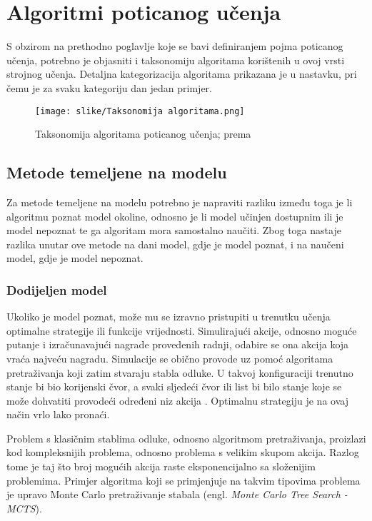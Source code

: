 \documentclass[]{foi} %
\begin{document}
\section{Algoritmi poticanog učenja}
S obzirom na prethodno poglavlje koje se bavi definiranjem pojma poticanog učenja, potrebno je objasniti i
taksonomiju algoritama korištenih u ovoj vrsti strojnog učenja. Detaljna kategorizacija algoritama prikazana \cite[poglavlje 3]{DeepRL} je u nastavku, pri čemu je za svaku kategoriju dan jedan primjer.

\begin{figure}[H]
    \centering
    \texttt{[image: slike/Taksonomija algoritama.png]}
    \caption{Taksonomija algoritama poticanog učenja; prema \cite[poglavlje 3]{DeepRL}}
\end{figure}

\subsection{Metode temeljene na modelu}
Za metode temeljene na modelu potrebno je napraviti razliku između toga je li algoritmu poznat model okoline, odnosno je li model učinjen dostupnim ili je model nepoznat te ga algoritam mora samostalno naučiti. Zbog toga nastaje razlika unutar ove metode na dani model, gdje je model poznat, i na naučeni model, gdje je model nepoznat.

\subsubsection{Dodijeljen model}
Ukoliko je model poznat, može mu se izravno pristupiti u trenutku učenja optimalne strategije ili funkcije vrijednosti. Simulirajući akcije, odnosno moguće putanje i izračunavajući nagrade provedenih radnji, odabire se ona akcija koja vraća najveću nagradu. Simulacije se obično provode uz pomoć algoritama pretraživanja koji zatim stvaraju stabla odluke. U takvoj konfiguraciji trenutno stanje bi bio korijenski čvor, a svaki sljedeći čvor ili list bi bilo stanje koje se može dohvatiti provodeći određeni niz akcija \cite{modeli}. Optimalnu strategiju je na ovaj način vrlo lako pronaći.

Problem s klasičnim stablima odluke, odnosno algoritmom pretraživanja, proizlazi kod kompleksnijih problema, odnosno problema s velikim skupom akcija. Razlog tome je taj što broj mogućih akcija raste eksponencijalno sa složenijim problemima. Primjer algoritma koji se primjenjuje na takvim tipovima problema je upravo Monte Carlo pretraživanje stabala (engl. \textit{Monte Carlo Tree Search - MCTS}). 
\end{document}
